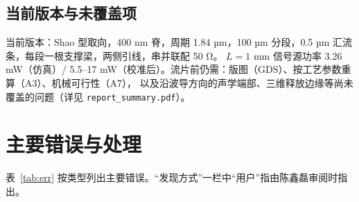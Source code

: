 \documentclass[10pt,a4paper]{article}
\begin{document}
\subsection{当前版本与未覆盖项}
当前版本：Shao 型取向，400 nm 脊，周期 1.84 µm，100 µm 分段，0.5 µm 汇流条，每段一根支撑梁，两侧引线，串并联配 50 Ω。
$L=1$ mm 信号源功率 3.26 mW（仿真）/ 5.5–17 mW（校准后）。流片前仍需：版图（GDS）、按工艺参数重算（A3）、机械可行性（A7），
以及沿波导方向的声学端部、三维释放边缘等尚未覆盖的问题（详见 \texttt{report\_summary.pdf}）。

\section{主要错误与处理}
表~\ref{tab:err} 按类型列出主要错误。“发现方式”一栏中“用户”指由陈鑫磊审阅时指出。
\end{document}
